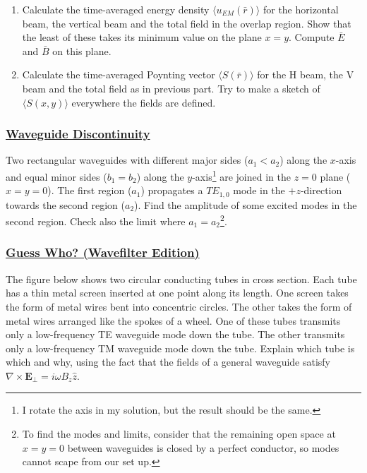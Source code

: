 \begin{enumerate}
	\item Calculate the time-averaged energy density $\langle u_{EM}(\bar{r})\rangle$ for the horizontal beam, the vertical beam and the total field in the overlap region. Show that the least of these takes its minimum value on the plane $x = y$. Compute $\bar{E}$ and $\bar{B}$ on this plane.
	\item Calculate the time-averaged Poynting vector $\langle S(\bar{r})\rangle$ for the H beam, the V beam and the total field as in previous part. Try to make a sketch of $\langle S(x,y)\rangle$ everywhere the fields are defined.
\end{enumerate}

\subsubsection{\hyperref[Waveguide Discontinuity]{Waveguide Discontinuity}}

Two rectangular waveguides with different major sides ($a_{1} < a_{2}$) along the $x$-axis and equal minor sides ($b_{1}= b_{2}$) along the $y$-axis\footnote{I rotate the axis in my solution, but the result should be the same.} are joined in the $z=0$ plane ($x=y=0$). The first region ($a_{1}$) propagates a $TE_{1,0}$ mode in the $+z$-direction towards the second region ($a_{2}$). Find the amplitude of some excited modes in the second region. Check also the limit where $a_{1} = a_{2}$\footnote{To find the modes and limits, consider that the remaining open space at $x=y=0$ between waveguides is closed by a perfect conductor, so modes cannot scape from our set up.}.

\subsubsection{\hyperref[Guess Who? (Wavefilter Edition)]{Guess Who? (Wavefilter Edition)}}

The figure below shows two circular conducting tubes in cross section. Each tube has a thin metal screen inserted at one point along its length. One screen takes the form of metal wires bent into concentric circles. The other takes the form of metal wires arranged like the spokes of a wheel. One of these tubes transmits only a low-frequency TE waveguide mode down the tube. The other transmits only a low-frequency TM waveguide mode down the tube. Explain which tube is which and why, using the fact that the fields of a general waveguide satisfy $\nabla \times \mathbf{E}_{\perp}=i \omega B_{z} \hat{z}$.

